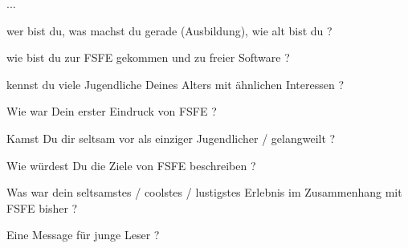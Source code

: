 ...

wer bist du, was machst du gerade (Ausbildung), wie alt bist du ?




wie bist du zur FSFE gekommen und zu freier Software ?



kennst du viele Jugendliche Deines Alters mit ähnlichen Interessen ?



Wie war Dein erster Eindruck von FSFE ?



Kamst Du dir seltsam vor als einziger Jugendlicher / gelangweilt ?


Wie würdest Du die Ziele von FSFE beschreiben ?


Was war dein seltsamstes / coolstes / lustigstes Erlebnis im Zusammenhang mit FSFE bisher ?


Eine Message für junge Leser ?

